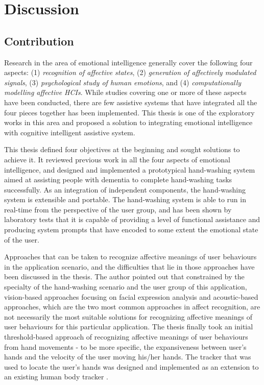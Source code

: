 \chapter{Discussion}
\label{chap:discuss}

\section{Contribution}

Research in the area of emotional intelligence generally cover the following four aspects: (1) \textit{recognition of affective states}, (2) \textit{generation of affectively modulated signals}, (3) \textit{psychological study of human emotions}, and (4) \textit{computationally modelling affective HCIs}. While studies covering one or more of these aspects have been conducted, there are few assistive systems that have integrated all the four pieces together has been implemented. This thesis is one of the exploratory works in this area and proposed a solution to integrating emotional intelligence with cognitive intelligent assistive system. 

This thesis defined four objectives at the beginning and sought solutions to achieve it. It reviewed previous work in all the four aspects of emotional intelligence, and designed and implemented a prototypical hand-washing system aimed at assisting people with dementia to complete hand-washing tasks successfully. As an integration of independent components, the hand-washing system is extensible and portable. The hand-washing system is able to run in real-time from the perspective of the user group, and has been shown by laboratory tests that it is capable of providing a level of functional assistance and producing system prompts that have encoded to some extent the emotional state of the user.

Approaches that can be taken to recognize affective meanings of user behaviours in the application scenario, and the difficulties that lie in those approaches have been discussed in the thesis. The author pointed out that constrained by the specialty of the hand-washing scenario and the user group of this application, vision-based approaches focusing on facial expression analysis and acoustic-based approaches, which are the two most common approaches in affect recognition, are not necessarily the most suitable solutions for recognizing affective meanings of user behaviours for this particular application. The thesis finally took an initial threshold-based approach of recognizing affective meanings of user behaviours from hand movements - to be more specific, the expansiveness between user's hands and the velocity of the user moving his/her hands. The tracker that was used to locate the user's hands was designed and implemented as an extension to an existing human body tracker \cite{czarnuch2014}.

